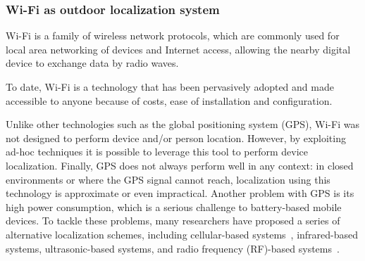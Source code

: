 

\subsubsection{Wi-Fi as outdoor localization system}\label{subsec:wi-fi-as-outdoor-localization-system}

Wi-Fi is a family of wireless network protocols, which are commonly used for local area networking of devices and Internet access, allowing the
nearby digital device to exchange data by radio waves.

To date, Wi-Fi is a technology that has been pervasively adopted and made accessible to anyone because of costs, ease of installation and
configuration.

Unlike other technologies such as the global positioning system (GPS), Wi-Fi was not designed to perform device and/or person location. However, by
exploiting ad-hoc techniques it is possible to leverage this tool to perform device localization. Finally, GPS does not always perform well in any
context: in closed environments or where the GPS signal cannot reach, localization using this technology is approximate or even impractical. Another
problem with GPS is its high power consumption, which is a serious challenge to battery-based mobile devices. To tackle these problems, many
researchers have proposed a series of alternative localization schemes, including cellular-based systems~\cite{ibrahim2010cellsense}, infrared-based
systems, ultrasonic-based systems, and radio frequency (RF)-based systems~\cite{bahl2000radar, youssef2002probabilistic}.

